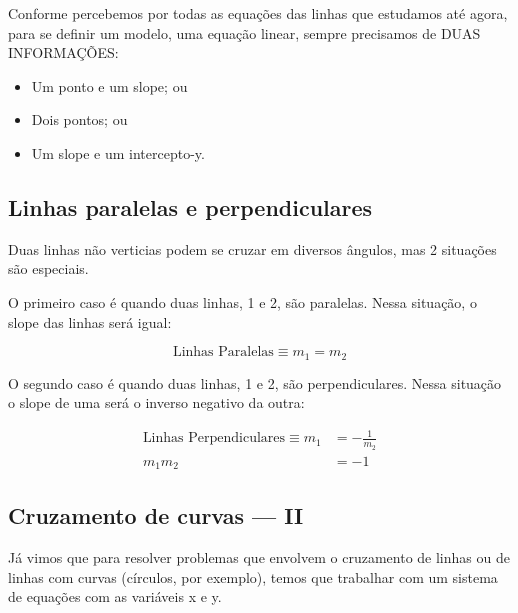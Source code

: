 \documentclass[pdftex, brazil, 12pt, twoside]{article}
\begin{document}
Conforme percebemos por todas as equações das linhas que estudamos até agora,
para se definir um modelo, uma equação linear, sempre precisamos de DUAS INFORMAÇÕES:

\begin{itemize}[noitemsep]
\item Um ponto e um slope; ou
\item Dois pontos; ou
\item Um slope e um intercepto-y.
\end{itemize}


\subsection{Linhas paralelas e perpendiculares}
\label{modelagem-linear-paralelas-perpendiculares}

Duas linhas não verticias podem se cruzar em diversos ângulos, mas 2 situações
são especiais.

O primeiro caso é quando duas linhas, 1 e 2, são paralelas. Nessa situação,
o slope das linhas será igual:

\begin{equation}
  \text{Linhas Paralelas} \equiv m_1 = m_2
\end{equation}

O segundo caso é quando duas linhas, 1 e 2, são perpendiculares. Nessa situação
o slope de uma será o inverso negativo da outra:

\begin{equation}
  \begin{split}
    \text{Linhas Perpendiculares} \equiv m_1    & = -\frac{1}{m_2}\\
                                         m_1m_2 & = -1
  \end{split}
\end{equation}


\subsection{Cruzamento de curvas --- II}
\label{modelagem-linear-cruzamento-curvas-ii}

Já vimos que para resolver problemas que envolvem o cruzamento de linhas ou
de linhas com curvas (círculos, por exemplo), temos que trabalhar com um sistema
de equações com as variáveis x e y.
\end{document}
